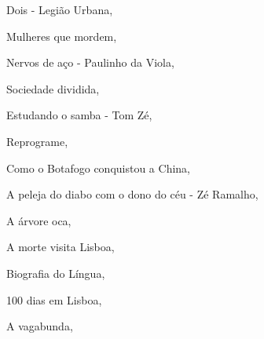 \begin{multicols}{2}
\begin{enumerate}
{\item Dois - Legião Urbana, {}
\item Mulheres que mordem, {}
\item Nervos de aço - Paulinho da Viola, {}
\item Sociedade dividida, {}
\item Estudando o samba - Tom Zé, {}
\item Reprograme, {}
\item Como o Botafogo conquistou a China, {}
\item A peleja do diabo com o dono do céu - Zé Ramalho, {}
\item A árvore oca, {}
\item A morte visita Lisboa, {}
\item Biografia do Língua, {}
\item 100 dias em Lisboa, {}
\item A vagabunda, {}
}
\end{enumerate}
\end{multicols}

\pagebreak

